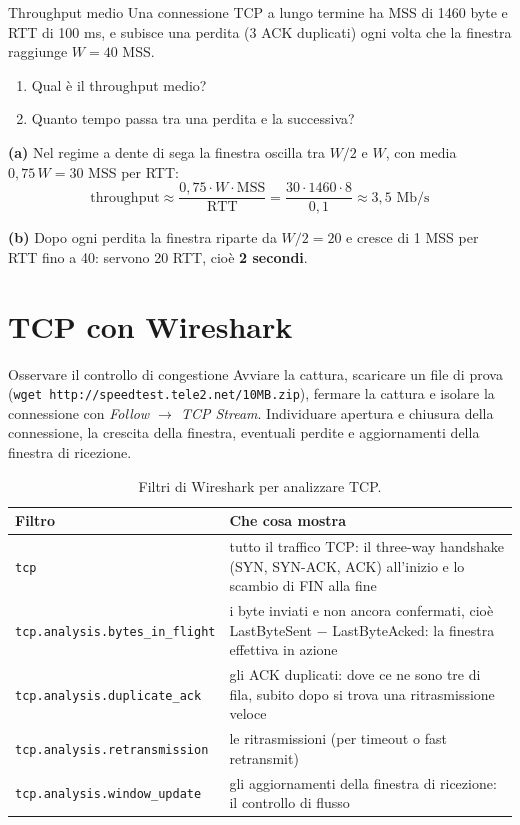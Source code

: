 \begin{esercizio}{Throughput medio}
Una connessione TCP a lungo termine ha MSS di 1460 byte e RTT di 100 ms, e subisce una perdita (3 ACK duplicati) ogni volta che
la finestra raggiunge $W = 40$ MSS.
\begin{enumerate}[label=(\alph*)]
    \item Qual è il throughput medio?
    \item Quanto tempo passa tra una perdita e la successiva?
\end{enumerate}
\end{esercizio}

\svolgimento
\textbf{(a)} Nel regime a dente di sega la finestra oscilla tra $W/2$ e $W$, con media $0{,}75\,W = 30$ MSS per RTT:
$$\text{throughput} \approx \frac{0{,}75 \cdot W \cdot \text{MSS}}{\text{RTT}} = \frac{30 \cdot 1460 \cdot 8}{0{,}1} \approx 3{,}5 \text{ Mb/s}$$

\textbf{(b)} Dopo ogni perdita la finestra riparte da $W/2 = 20$ e cresce di 1 MSS per RTT fino a 40: servono 20 RTT, cioè
\textbf{2 secondi}.

\section{TCP con Wireshark}

\begin{esercizio}{Osservare il controllo di congestione}
Avviare la cattura, scaricare un file di prova (\texttt{wget http://speedtest.tele2.net/10MB.zip}), fermare la cattura e isolare la
connessione con \emph{Follow $\rightarrow$ TCP Stream}. Individuare apertura e chiusura della connessione, la crescita della
finestra, eventuali perdite e aggiornamenti della finestra di ricezione.
\end{esercizio}

\svolgimento
\begin{table}[H]
\centering
\small
\begin{tabular}{p{4.5cm}p{10cm}}
\toprule
\textbf{Filtro} & \textbf{Che cosa mostra} \\
\midrule
\texttt{tcp} & tutto il traffico TCP: il three-way handshake (SYN, SYN-ACK, ACK) all'inizio e lo scambio di FIN alla fine \\
\texttt{tcp.analysis.bytes\_in\_flight} & i byte inviati e non ancora confermati, cioè LastByteSent $-$ LastByteAcked: la finestra effettiva in azione \\
\texttt{tcp.analysis.duplicate\_ack} & gli ACK duplicati: dove ce ne sono tre di fila, subito dopo si trova una ritrasmissione veloce \\
\texttt{tcp.analysis.retransmission} & le ritrasmissioni (per timeout o fast retransmit) \\
\texttt{tcp.analysis.window\_update} & gli aggiornamenti della finestra di ricezione: il controllo di flusso \\
\bottomrule
\end{tabular}
\caption{Filtri di Wireshark per analizzare TCP.}
\end{table}

